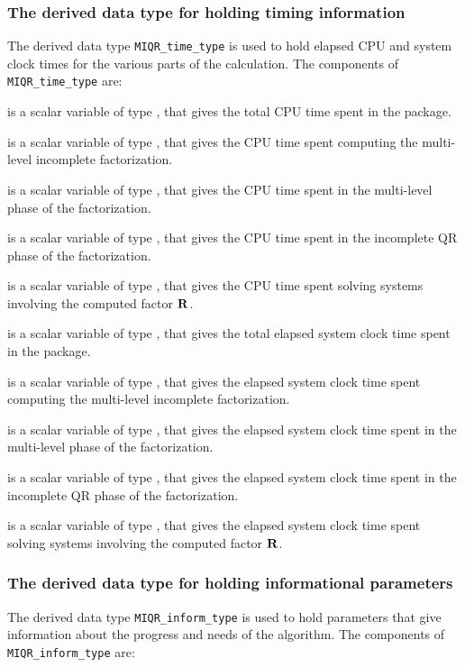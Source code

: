 \documentclass{galahad}
\newcommand{\packagename}{MIQR}
\begin{document}

\subsubsection{The derived data type for holding timing 
 information}\label{typetime}
The derived data type 
{\tt \packagename\_time\_type} 
is used to hold elapsed CPU and system clock times for the various parts of 
the calculation. The components of 
{\tt \packagename\_time\_type} 
are:
\begin{description}
 is a scalar variable of type \realdp, that gives
 the total CPU time spent in the package.

 is a scalar variable of type \realdp, that gives
 the CPU time spent computing the multi-level incomplete factorization.

 is a scalar variable of type \realdp, that gives
 the CPU time spent in the multi-level phase of the factorization.

 is a scalar variable of type \realdp, that gives
 the CPU time spent in the incomplete QR phase of the factorization.

 is a scalar variable of type \realdp, that gives
 the CPU time spent  solving systems involving the computed factor ${\mathbf{R}}$.

 is a scalar variable of type \realdp, that gives
 the total elapsed system clock time spent in the package.

 is a scalar variable of type \realdp, that gives
 the elapsed system clock time spent computing the multi-level incomplete 
factorization.

 is a scalar variable of type \realdp, that gives
 the elapsed system clock time spent in the multi-level phase of the 
factorization.

 is a scalar variable of type \realdp, that gives
the elapsed system clock time spent in the incomplete QR phase of the 
factorization.

 is a scalar variable of type \realdp, that gives
 the elapsed system clock time spent solving systems involving the computed 
factor ${\mathbf{R}}$.

\end{description}



\subsubsection{The derived data type for holding informational
 parameters}\label{typeinform}
The derived data type 
{\tt \packagename\_inform\_type} 
is used to hold parameters that give information about the progress and needs 
of the algorithm. The components of 
{\tt \packagename\_inform\_type} 
are:
\end{document}

